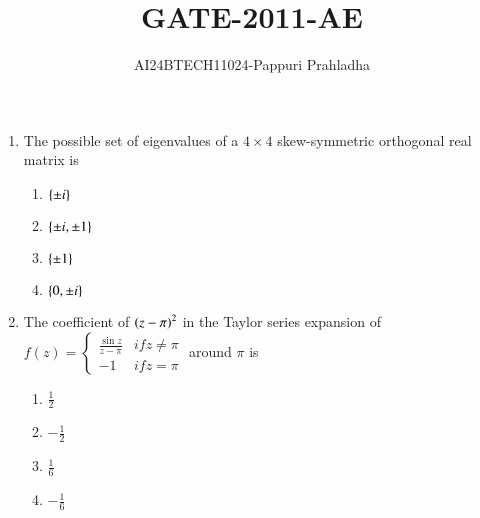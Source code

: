 \documentclass[journal]{IEEEtran}
\begin{document}

\vspace{3cm}

\title{GATE-2011-AE}
\author{AI24BTECH11024-Pappuri Prahladha}
{\let\newpage\relax\maketitle}

\renewcommand{\thefigure}{\theenumi}
\renewcommand{\thetable}{\theenumi}
\setlength{\intextsep}{10pt} %


\renewcommand{\thetable}{\theenumi}
\begin{enumerate}
\item  The possible set of eigenvalues of a $ 4 \times 4 $ skew-symmetric orthogonal real matrix is
\begin{multicols}{4}
\begin{enumerate}
    \item $\left\{\pm i\right\}$ 
    \item $\left\{\pm i,\pm 1\right\}$
    \item $\left\{\pm 1\right\}$
    \item $\left\{0,\pm i\right\}$
\end{enumerate}
\end{multicols}
\item The coefficient of $ \left(z - \pi\right)^{2}$ in the Taylor series expansion of
$
f(z) = \begin{cases} \frac{\sin z}{z - \pi} & if  z \neq \pi \\ -1 & if  z = \pi \end{cases}
$
around $\pi$ is
\begin{multicols}{4}
\begin{enumerate}
    \item $\frac{1}{2}$ 
    \item $ -\frac{1}{2} $
    \item $ \frac{1}{6}$ 
    \item $ -\frac{1}{6}$ 
\end{enumerate}
\end{multicols}

\end{enumerate}
\end{document}
